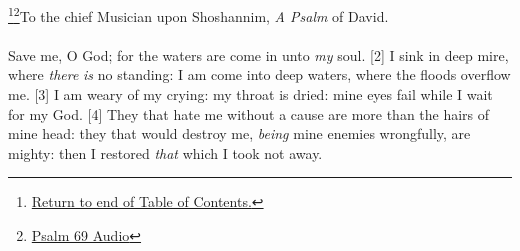 \footnote{\textcolor[rgb]{0.00,0.25,0.00}{\hyperlink{TOC}{Return to end of Table of Contents.}}}\footnote{\href{https://audiobible.com/bible/psalms_69.html}{\textcolor[cmyk]{0.99998,1,0,0}{Psalm 69 Audio}}}\textcolor[cmyk]{0.99998,1,0,0}{To the chief Musician upon Shoshannim, \emph{A Psalm} of David.}\\
\\
\textcolor[cmyk]{0.99998,1,0,0}{Save me, O God; for the waters are come in unto \emph{my} soul.}
[2] \textcolor[cmyk]{0.99998,1,0,0}{I sink in deep mire, where \emph{there} \emph{is} no standing: I am come into deep waters, where the floods overflow me.}
[3] \textcolor[cmyk]{0.99998,1,0,0}{I am weary of my crying: my throat is dried: mine eyes fail while I wait for my God.} %
[4] \textcolor[cmyk]{0.99998,1,0,0}{They that hate me without a cause are more than the hairs of mine head: they that would destroy me, \emph{being} mine enemies wrongfully, are mighty: then I restored \emph{that} which I took not away.}
